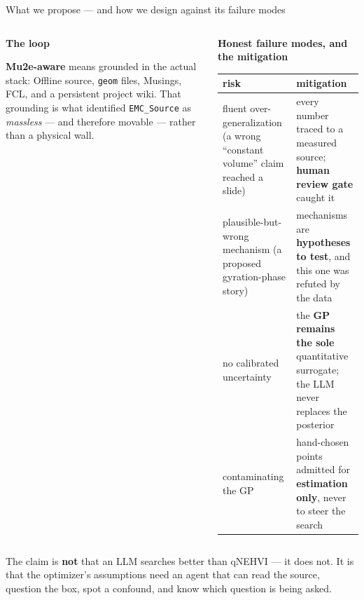 \documentclass[aspectratio=169,10pt]{beamer}
\begin{document}
\begin{frame}{What we propose --- and how we design against its failure modes}
\begin{columns}[T]
\begin{column}{0.50\textwidth}
\small\textbf{The loop}
\vspace{0.2em}
\begin{center}
\footnotesize
{}
\end{center}
\vspace{0.4em}
{\footnotesize
\textbf{Mu2e-aware} means grounded in the actual stack: Offline source, \texttt{geom}
files, Musings, FCL, and a persistent project wiki. That grounding is what identified
\texttt{EMC\_Source} as \emph{massless} --- and therefore movable --- rather than a
physical wall.}
\end{column}
\begin{column}{0.47\textwidth}
\small\textbf{Honest failure modes, and the mitigation}
\vspace{0.2em}
\scriptsize
\begin{tabular}{@{}W{2.2cm}W{2.9cm}@{}}
\toprule
risk & mitigation \\
\midrule
fluent over-gene\-ralization (a wrong ``constant volume'' claim reached a slide) &
every number traced to a measured source; \textbf{human review gate} caught it
\\[0.3em]
plausible-but-wrong mechanism (a proposed gyration-phase story) &
mechanisms are \textbf{hypotheses to test}, and this one was refuted by the data \\[0.3em]
no calibrated uncertainty &
the \textbf{GP remains the sole} quantitative surrogate; the LLM never replaces the
posterior \\[0.3em]
contaminating the GP &
hand-chosen points admitted for \textbf{estimation only}, never to steer the search \\
\bottomrule
\end{tabular}
\end{column}
\end{columns}
\vspace{0.5em}
\footnotesize
The claim is \textbf{not} that an LLM searches better than qNEHVI --- it does not. It
is that the optimizer's assumptions need an agent that can read the source, question
the box, spot a confound, and know which question is being asked.
\end{frame}
\end{document}
